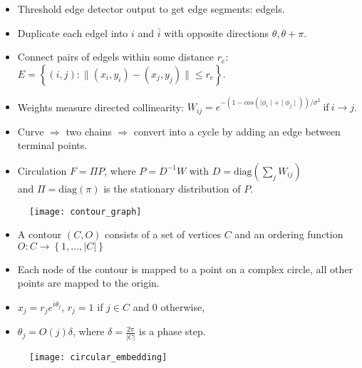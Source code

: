 \documentclass[11pt, a4paper, landscape]{article}
\begin{document}
\NewPage{}
\vfill
\begin{itemize}
\item Threshold edge detector output to get edge segments: edgels.
\item Duplicate each edgel into $i$ and $\bar{i}$ with opposite directions $\theta, \theta + \pi$.
\item Connect pairs of edgels within some distance $r_e$: $E = \left\lbrace (i, j) : \| (x_i, y_i) - (x_j, y_j) \| \leq r_e \right\rbrace $.
\item Weights measure directed collinearity: $W_{ij} = e^{-(1 - cos(\mid \phi_i \mid + \mid \phi_j \mid))/\sigma^2}\ \mathrm{if}\ i \rightarrow j$.
\item Curve $\Rightarrow$ two chains $\Rightarrow$ convert into a cycle by adding an edge between terminal points.
\item Circulation $F = \Pi P$, where $P = D^{-1}W$ with $D = \mathrm{diag}(\sum_jW_{ij})$\\
and $\Pi = \mathrm{diag}(\pi)$ is the stationary distribution of $P$.
\end{itemize}
\begin{figure}
	\centering
	\texttt{[image: contour\_graph]}
\end{figure}
\vfill


\NewPage{}
\vfill
\begin{itemize}
\item A contour $(C, O)$ consists of a set of vertices $C$ and an ordering function $O: C \rightarrow \left\lbrace 1, ..., \lvert C \rvert \right\rbrace $
\item Each node of the contour is mapped to a point on a complex circle, all other points are mapped to the origin.
\item $x_j = r_je^{i\theta_j}$, $r_j = 1$ if $j \in C$ and 0 otherwise,
\item $\theta_j = O(j)\delta$, where $\delta = \frac{2\pi}{\lvert C \rvert}$ is a phase step.
\end{itemize}
\begin{figure}
	\centering
	\texttt{[image: circular\_embedding]}
\end{figure}
\vfill
\end{document}
